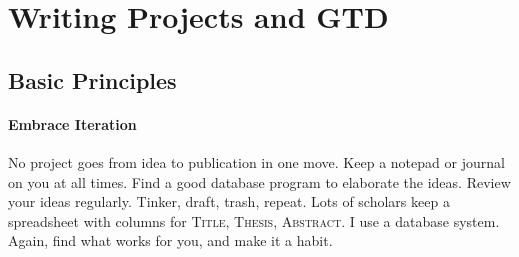 \documentclass{tufte-handout}
\begin{document}





\section{Writing Projects and GTD}
\label{sec:write-proj-gtd}

\subsection{Basic Principles}
\label{basic-principles}




\paragraph{Embrace Iteration} No project goes from idea to publication
in one move. Keep a notepad or journal on you at all times. Find a good database program to elaborate the ideas. Review your ideas regularly. Tinker, draft, trash, repeat. Lots of scholars keep a spreadsheet with columns for \textsc{Title, Thesis, Abstract}. I use a database system. Again, find what works for you, and make it a habit. 
\end{document}

